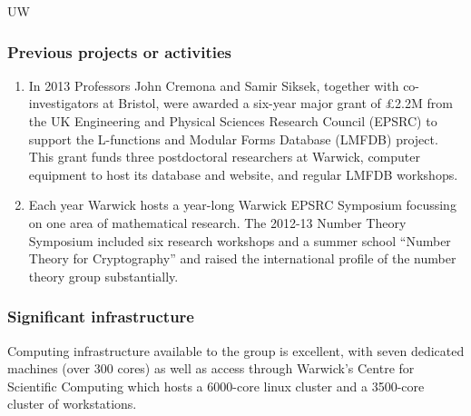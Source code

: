 \begin{sitedescription}{UW}
\subsubsection*{Previous projects or activities}

\begin{enumerate}
\item
In 2013 Professors John Cremona and Samir Siksek, together with
co-investigators at Bristol, were awarded a six-year major grant of
£2.2M from the UK Engineering and Physical Sciences Research Council
(EPSRC) to support the L-functions and Modular Forms Database (LMFDB)
project.  This grant funds three postdoctoral researchers at Warwick,
computer equipment to host its database and website, and regular LMFDB
workshops.
\item
Each year Warwick hosts a year-long Warwick EPSRC Symposium focussing
on one area of mathematical research.  The 2012-13 Number Theory
Symposium included six research workshops and a summer school ``Number
Theory for Cryptography'' and raised the international profile of the
number theory group substantially.
\end{enumerate}

\subsubsection*{Significant infrastructure}

Computing infrastructure available to the group is excellent, with
seven dedicated machines (over 300 cores) as well as access through
Warwick's Centre for Scientific Computing which hosts a 6000-core
linux cluster and a 3500-core cluster of workstations.
\end{sitedescription}

